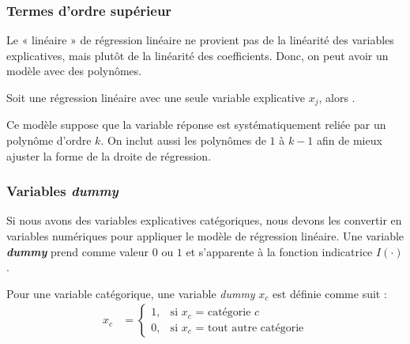 \documentclass[french]{article}
\begin{document}
\begin{multicols*}{2}
\subsubsection{Termes d'ordre supérieur}
\begin{rappel_enhanced}[Contexte]
Le « linéaire » de régression linéaire ne provient pas de la linéarité des variables explicatives, mais plutôt de la linéarité des coefficients. Donc, on peut avoir un modèle avec des polynômes.
\end{rappel_enhanced}

\begin{definitionNOHFILLsub}
Soit une régression linéaire avec une seule variable explicative $x_{j}$, alors . 

\bigskip

Ce modèle suppose que la variable réponse est systématiquement reliée par un polynôme d'ordre $k$. On inclut aussi les polynômes de $1$ à $k - 1$ afin de mieux ajuster la forme de la droite de régression.
\end{definitionNOHFILLsub}



\subsubsection{Variables \og \textit{dummy} \fg{}}
\begin{rappel_enhanced}[Contexte]
Si nous avons des variables explicatives catégoriques, nous devons les convertir en variables numériques pour appliquer le modèle de régression linéaire. Une variable \og \textit{\textbf{dummy}} \fg{} prend comme valeur $0$ ou $1$ et s'apparente à la fonction indicatrice $I(\cdot)$.
\end{rappel_enhanced}

\begin{definitionNOHFILL}
Pour une variable catégorique, une variable \og \textit{dummy} \fg{} $x_{c}$ est définie comme suit :
\begin{align*}
	x_{c}
	&=	\begin{cases}
		1,	&	\text{si $x_{c}$ = catégorie $c$}	\\
		0,	&	\text{si $x_{c}$ = tout autre catégorie}
		\end{cases}
\end{align*}


\end{definitionNOHFILL}
\end{multicols*}
\end{document}
